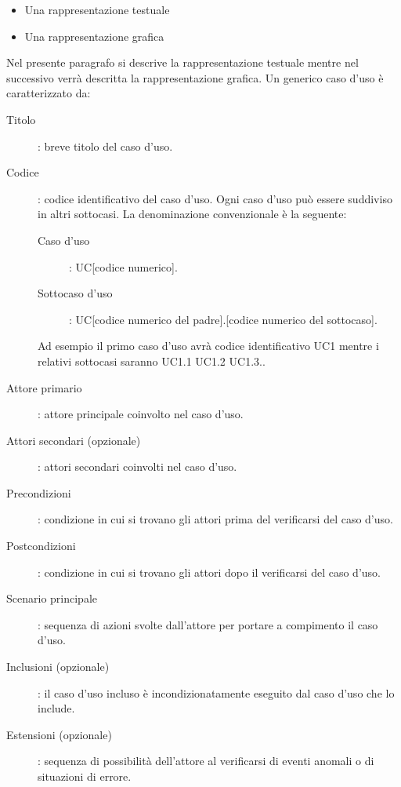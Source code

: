 \documentclass[../norme-di-progetto.tex]{subfiles}
\begin{document}
\begin{itemize}
  \item Una rappresentazione testuale
  \item Una rappresentazione grafica
\end{itemize}

Nel presente paragrafo si descrive la rappresentazione testuale mentre nel successivo verrà descritta la rappresentazione grafica. Un generico caso d'uso è caratterizzato da:
\begin{description}
  \item [Titolo]: breve titolo del caso d'uso.
  \item [Codice]: codice identificativo del caso d'uso. Ogni caso d'uso può essere suddiviso in altri sottocasi. La denominazione convenzionale è la seguente:
        \begin{description}
          \item [Caso d'uso]: UC[codice numerico].
          \item [Sottocaso d'uso]: UC[codice numerico del padre].[codice numerico del sottocaso].
        \end{description}
        Ad esempio il primo caso d'uso avrà codice identificativo UC1 mentre i relativi sottocasi saranno UC1.1 UC1.2 UC1.3..
  \item [Attore primario]: attore principale coinvolto nel caso d'uso.
  \item [Attori secondari (opzionale)]: attori secondari coinvolti nel caso d'uso.
  \item [Precondizioni]: condizione in cui si trovano gli attori prima del verificarsi del caso d'uso.
  \item [Postcondizioni]: condizione in cui si trovano gli attori dopo il verificarsi del caso d'uso.
  \item [Scenario principale]: sequenza di azioni svolte dall'attore per portare a compimento il caso d'uso.
  \item [Inclusioni (opzionale)]: il caso d'uso incluso è incondizionatamente eseguito dal caso d'uso che lo include.
  \item [Estensioni (opzionale)]: sequenza di possibilità dell'attore al verificarsi di eventi anomali o di situazioni di errore.
\end{description}
\end{document}
